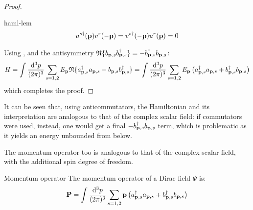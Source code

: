 \begin{proofbox}
\begin{proof}
    \begin{lemma}[before upper = {\tcbtitle}, borderline = {1pt}{0pt}{blue!35!black}]{}{haml-lem}
      \begin{equation*}
        u^{s\dagger}(\mathbf{p}) v^r(-\mathbf{p}) = v^{s\dagger}(-\mathbf{p}) u^r(\mathbf{p}) = 0
      \end{equation*}
    \end{lemma}

    Using ,  and the antisymmetry $ \mathfrak{N}\{b_{\mathbf{p},s} b_{\mathbf{p},s}^\dagger\} = - b_{\mathbf{p},s}^\dagger b_{\mathbf{p},s} $:
    \begin{equation*}
      H = \int \frac{\mathrm{d}^3p}{(2\pi)^3} \sum_{s = 1,2} E_{\mathbf{p}} \mathfrak{N}\{a_{\mathbf{p},s}^\dagger a_{\mathbf{p},s} - b_{\mathbf{p},s} b_{\mathbf{p},s}^\dagger\} = \int \frac{\mathrm{d}^3p}{(2\pi)^3} \sum_{s = 1,2} E_{\mathbf{p}} \left( a_{\mathbf{p},s}^\dagger a_{\mathbf{p},s} + b_{\mathbf{p},s}^\dagger b_{\mathbf{p},s} \right)
    \end{equation*}
    which completes the proof.
  \end{proof}

\end{proofbox}

It can be seen that, using anticommutators, the Hamiltonian and its interpretation are analogous to that of the complex scalar field: if commutators were used, instead, one would get a final $ - b_{\mathbf{p},s}^\dagger b_{\mathbf{p},s} $ term, which is problematic as it yields an energy unbounded from below\footnotemark{}.
%

The momentum operator too is analogous to that of the complex scalar field, with the additional spin degree of freedom.

\begin{proposition}{Momentum operator}{}
  The momentum operator of a Dirac field $ \Psi $ is:
  \begin{equation}
    \mathbf{P} = \int \frac{\mathrm{d}^3p}{(2\pi)^3} \sum_{s = 1,2} \mathbf{p} \left( a_{\mathbf{p},s}^\dagger a_{\mathbf{p},s} + b_{\mathbf{p},s}^\dagger b_{\mathbf{p},s} \right)
  \end{equation}
\end{proposition}

